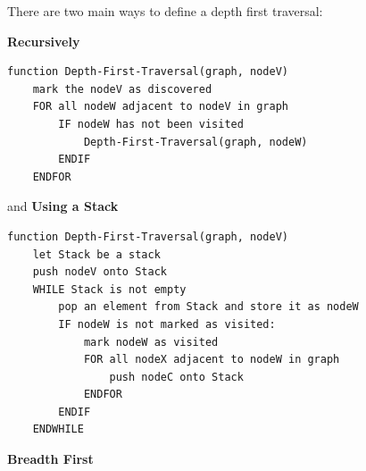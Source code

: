   There are two main ways to define a depth first traversal:
  
  \textbf{Recursively}
  
\begin{verbatim}function Depth-First-Traversal(graph, nodeV)
    mark the nodeV as discovered
    FOR all nodeW adjacent to nodeV in graph
        IF nodeW has not been visited
            Depth-First-Traversal(graph, nodeW)
        ENDIF
    ENDFOR\end{verbatim}
    
  and \textbf{Using a Stack}
  
\begin{verbatim}function Depth-First-Traversal(graph, nodeV)
    let Stack be a stack
    push nodeV onto Stack
    WHILE Stack is not empty
        pop an element from Stack and store it as nodeW
        IF nodeW is not marked as visited:
            mark nodeW as visited
            FOR all nodeX adjacent to nodeW in graph 
                push nodeC onto Stack
            ENDFOR
        ENDIF
    ENDWHILE\end{verbatim}
  
  {\large \textbf{Breadth First}}
  
